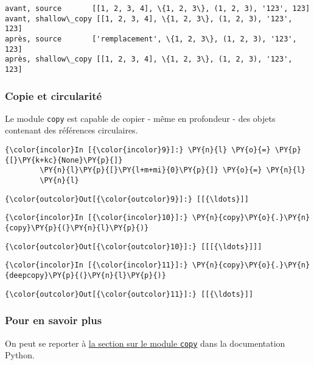     \begin{Verbatim}[commandchars=\\\{\}]
avant, source       [[1, 2, 3, 4], \{1, 2, 3\}, (1, 2, 3), '123', 123]
avant, shallow\_copy [[1, 2, 3, 4], \{1, 2, 3\}, (1, 2, 3), '123', 123]
après, source       ['remplacement', \{1, 2, 3\}, (1, 2, 3), '123', 123]
après, shallow\_copy [[1, 2, 3, 4], \{1, 2, 3\}, (1, 2, 3), '123', 123]

    \end{Verbatim}

    \hypertarget{copie-et-circularituxe9}{%
\subsubsection{Copie et circularité}\label{copie-et-circularituxe9}}

    Le module \texttt{copy} est capable de copier - même en profondeur - des
objets contenant des références circulaires.

    \begin{Verbatim}[commandchars=\\\{\}]
{\color{incolor}In [{\color{incolor}9}]:} \PY{n}{l} \PY{o}{=} \PY{p}{[}\PY{k+kc}{None}\PY{p}{]}
        \PY{n}{l}\PY{p}{[}\PY{l+m+mi}{0}\PY{p}{]} \PY{o}{=} \PY{n}{l}
        \PY{n}{l}
\end{Verbatim}


\begin{Verbatim}[commandchars=\\\{\}]
{\color{outcolor}Out[{\color{outcolor}9}]:} [[{\ldots}]]
\end{Verbatim}
            
    \begin{Verbatim}[commandchars=\\\{\}]
{\color{incolor}In [{\color{incolor}10}]:} \PY{n}{copy}\PY{o}{.}\PY{n}{copy}\PY{p}{(}\PY{n}{l}\PY{p}{)}
\end{Verbatim}


\begin{Verbatim}[commandchars=\\\{\}]
{\color{outcolor}Out[{\color{outcolor}10}]:} [[[{\ldots}]]]
\end{Verbatim}
            
    \begin{Verbatim}[commandchars=\\\{\}]
{\color{incolor}In [{\color{incolor}11}]:} \PY{n}{copy}\PY{o}{.}\PY{n}{deepcopy}\PY{p}{(}\PY{n}{l}\PY{p}{)}
\end{Verbatim}


\begin{Verbatim}[commandchars=\\\{\}]
{\color{outcolor}Out[{\color{outcolor}11}]:} [[{\ldots}]]
\end{Verbatim}
            
    \hypertarget{pour-en-savoir-plus}{%
\subsubsection{Pour en savoir plus}\label{pour-en-savoir-plus}}

    On peut se reporter à
\href{https://docs.python.org/3/library/copy.html}{la section sur le
module \texttt{copy}} dans la documentation Python.